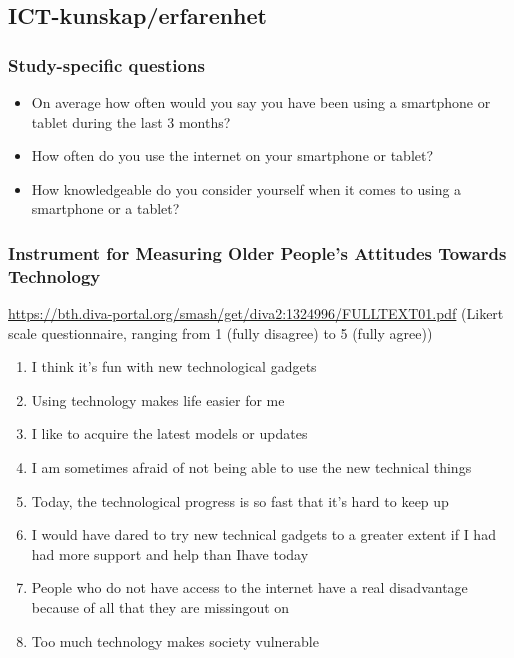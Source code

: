 \documentclass[]{tufte-handout}
\providecommand{\tightlist}{%
  \setlength{\itemsep}{0pt}\setlength{\parskip}{0pt}}
\begin{document}
\hypertarget{ict-kunskaperfarenhet}{%
\subsection{ICT-kunskap/erfarenhet}\label{ict-kunskaperfarenhet}}

\hypertarget{study-specific-questions}{%
\subsubsection{Study-specific
questions}\label{study-specific-questions}}

\begin{itemize}
\tightlist
\item
  On average how often would you say you have been using a smartphone or
  tablet during the last 3 months?
\item
  How often do you use the internet on your smartphone or tablet?
\item
  How knowledgeable do you consider yourself when it comes to using a
  smartphone or a tablet?
\end{itemize}

\hypertarget{instrument-for-measuring-older-peoples-attitudes-towards-technology}{%
\subsubsection{Instrument for Measuring Older People's Attitudes Towards
Technology}\label{instrument-for-measuring-older-peoples-attitudes-towards-technology}}

\url{https://bth.diva-portal.org/smash/get/diva2:1324996/FULLTEXT01.pdf}
(Likert scale questionnaire, ranging from 1 (fully disagree) to 5 (fully
agree))

\begin{enumerate}
\def\labelenumi{\arabic{enumi}.}
\tightlist
\item
  I think it's fun with new technological gadgets
\item
  Using technology makes life easier for me
\item
  I like to acquire the latest models or updates
\item
  I am sometimes afraid of not being able to use the new technical
  things
\item
  Today, the technological progress is so fast that it's hard to keep up
\item
  I would have dared to try new technical gadgets to a greater extent if
  I had had more support and help than Ihave today
\item
  People who do not have access to the internet have a real disadvantage
  because of all that they are missingout on
\item
  Too much technology makes society vulnerable
\end{enumerate}
\end{document}
